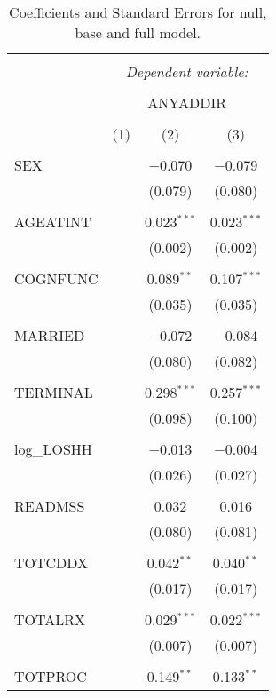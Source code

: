 \documentclass{article}
\begin{document}
\begin{table}[h] \centering 
  \caption{Coefficients and Standard Errors for null, base and full model.} 
  \label{} 
\begin{tabular}{@{\extracolsep{5pt}}lccc} 
\\[-1.8ex]\hline 
\hline \\[-1.8ex] 
 & \multicolumn{3}{c}{\textit{Dependent variable:}} \\ 
\cline{2-4} 
\\[-1.8ex] & \multicolumn{3}{c}{ANYADDIR} \\ 
\\[-1.8ex] & (1) & (2) & (3)\\ 
\hline \\[-1.8ex] 
 SEX &  & $-$0.070 & $-$0.079 \\ 
  &  & (0.079) & (0.080) \\ 
  & & & \\ 
 AGEATINT &  & 0.023$^{***}$ & 0.023$^{***}$ \\ 
  &  & (0.002) & (0.002) \\ 
  & & & \\ 
 COGNFUNC &  & 0.089$^{**}$ & 0.107$^{***}$ \\ 
  &  & (0.035) & (0.035) \\ 
  & & & \\ 
 MARRIED &  & $-$0.072 & $-$0.084 \\ 
  &  & (0.080) & (0.082) \\ 
  & & & \\ 
 TERMINAL &  & 0.298$^{***}$ & 0.257$^{***}$ \\ 
  &  & (0.098) & (0.100) \\ 
  & & & \\ 
 log\_LOSHH &  & $-$0.013 & $-$0.004 \\ 
  &  & (0.026) & (0.027) \\ 
  & & & \\ 
 READMSS &  & 0.032 & 0.016 \\ 
  &  & (0.080) & (0.081) \\ 
  & & & \\ 
 TOTCDDX &  & 0.042$^{**}$ & 0.040$^{**}$ \\ 
  &  & (0.017) & (0.017) \\ 
  & & & \\ 
 TOTALRX &  & 0.029$^{***}$ & 0.022$^{***}$ \\ 
  &  & (0.007) & (0.007) \\ 
  & & & \\ 
 TOTPROC &  & 0.149$^{**}$ & 0.133$^{**}$ \\ 

\end{tabular}
\end{table}
\end{document}
